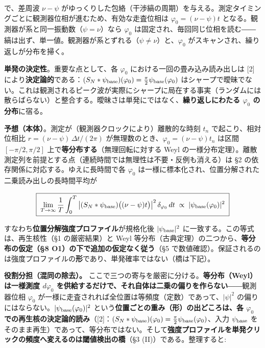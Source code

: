 \documentclass[
]{ltjsarticle}
\begin{document}
で、差周波 \(\nu-\psi\)
がゆっくりした包絡（干渉縞の周期）を与える。測定タイミングごとに観測器位相が進むため、有効な走査位相は
\(\varphi_0=(\nu-\psi)t\)
となる。観測器が系と同一振動数（\(\psi=\nu\)）なら \(\varphi_0\)
は固定され、毎回同じ位相を読む――縞は出ず、単一値。観測器が系とずれる（\(\psi\ne\nu\)）と、\(\varphi_0\)
がスキャンされ、繰り返しが分布を掃く。

\textbf{単発の決定性}。重要な点として、各 \(\varphi_0\)
における一回の畳み込み読み出しは {[}2{]}
により\textbf{決定論的}である：\((S_N*\psi_{\rm base})(\varphi_0)=\tfrac{\pi}{2}\psi_{\rm base}(\varphi_0)\)
はシャープで曖昧でない。これは観測されるピーク波が実際にシャープに局在する事実（ランダムには散らばらない）と整合する。曖昧さは単発にではなく、\textbf{繰り返しにわたる
\(\varphi_0\) の分布}に宿る。

\textbf{予想（本体）}。測定が（観測器クロックにより）離散的な時刻
\(t_n\) で起こり、相対位相比 \(r=(\nu-\psi)\,\Delta t/(2\pi)\)
が無理数のとき、\(\varphi_0=(\nu-\psi)t_n\) は区間 \([-\pi/2,\pi/2]\)
上で\textbf{等分布する}（無理回転に対する Weyl
の一様分布定理）。離散測定列を前提とする点（連続時間では無理性は不要・反例も消える）は
§2 の依存関係に対応する。ゆえに長時間で各 \(\varphi_0\)
は一様に標本化され、位置分解された二乗読み出しの長時間平均が

\[
\boxed{\;\lim_{T\to\infty}\frac1T\int_0^T \big|(S_N*\psi_{\rm base})\big((\nu-\psi)t\big)\big|^2\,\delta_{\varphi_0}\,dt
\;\propto\; |\psi_{\rm base}(\varphi_0)|^2\;}
\]

すなわち\textbf{位置分解強度プロファイル}が規格化後
\(|\psi_{\rm base}|^2\) に一致する。この等式は、再生核性（§1
の厳密結果）と Weyl
等分布（古典定理）の二つから、\textbf{等分布の仮定（§8
O1）の下で追加の仮定なく従う}（§5
で数値確認）。保証されるのは強度プロファイルの\textbf{形}であり、単発確率ではない（橋は下記）。

\textbf{役割分担（混同の除去）。}
ここで三つの寄与を厳密に分ける。\textbf{等分布（Weyl）は一様測度
\(d\varphi_0\)
を供給するだけで、それ自体は二乗の偏りを作らない}――観測器位相
\(\varphi_0\)
が一様に走査されれば全位置は等頻度（定数）であって、\(|\psi|^2\)
の偏りにはならない。\(|\psi_{\rm base}(\varphi_0)|^2\)
という\textbf{位置ごとの重み（形）の出どころは、各 \(\varphi_0\)
での再生核の決定論的読み}（{[}2{]}：\((S_N*\psi_{\rm base})(\varphi_0)=\tfrac{\pi}{2}\psi_{\rm base}(\varphi_0)\)、入力
\(\psi_{\rm base}\)
をそのまま再生）であって、等分布ではない。そして\textbf{強度プロファイルを単発クリックの頻度へ変えるのは閾値検出の橋}（§3
(II)）である。整理すると:
\end{document}
